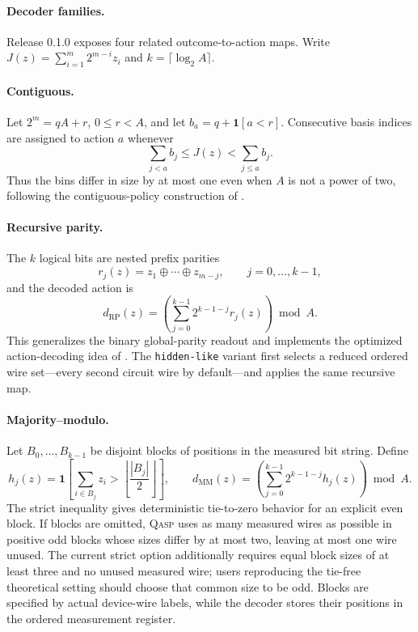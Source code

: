 \documentclass[10pt]{article}
\newcommand{\qasp}{\textsc{Qasp}}
\newcommand{\code}[1]{\texttt{#1}}
\newcommand{\version}{0.1.0}
\begin{document}
\paragraph{Decoder families.}

Release \version{} exposes four related outcome-to-action maps.  Write
$J(z)=\sum_{i=1}^{m}2^{m-i}z_i$ and
$k=\lceil\log_2A\rceil$.

\paragraph{Contiguous.}
Let $2^m=qA+r$, $0\leq r<A$, and let
$b_a=q+\mathbf 1[a<r]$.  Consecutive basis indices are assigned to action
$a$ whenever
\begin{equation}
  \sum_{j<a}b_j\leq J(z)<\sum_{j\leq a}b_j.
  \label{eq:contiguous-decoder}
\end{equation}
Thus the bins differ in size by at most one even when $A$ is not a power of
two, following the contiguous-policy construction of
\citet{jerbi2021policies}.

\paragraph{Recursive parity.}
The $k$ logical bits are nested prefix parities
\begin{equation}
  r_j(z)=z_1\oplus\cdots\oplus z_{m-j},
  \qquad j=0,\ldots,k-1,
  \label{eq:recursive-parity-bits}
\end{equation}
and the decoded action is
\begin{equation}
  d_{\mathrm{RP}}(z)
  =\left(\sum_{j=0}^{k-1}2^{k-1-j}r_j(z)\right)\bmod A.
  \label{eq:recursive-parity-decoder}
\end{equation}
This generalizes the binary global-parity readout and implements the optimized
action-decoding idea of \citet{Meyer2023ActionDecoding}.  The
\code{hidden-like} variant first selects a reduced ordered wire set---every
second circuit wire by default---and applies the same recursive map.

\paragraph{Majority--modulo.}
Let $B_0,\ldots,B_{k-1}$ be disjoint blocks of positions in the measured
bit string.  Define
\begin{equation}
  h_j(z)=\mathbf 1\!\left[
    \sum_{i\in B_j}z_i>\left\lfloor\frac{|B_j|}{2}\right\rfloor
  \right],
  \qquad
  d_{\mathrm{MM}}(z)
  =\left(\sum_{j=0}^{k-1}2^{k-1-j}h_j(z)\right)\bmod A.
  \label{eq:majority-modulo-decoder}
\end{equation}
The strict inequality gives deterministic tie-to-zero behavior for an
explicit even block.  If blocks are omitted, \qasp{} uses as many measured
wires as possible in positive odd blocks whose sizes differ by at most two,
leaving at most one wire unused.  The current strict option additionally
requires equal block sizes of at least three and no unused measured wire;
users reproducing the tie-free theoretical setting should choose that common
size to be odd.  Blocks are specified by actual device-wire labels, while the
decoder stores their positions in the ordered measurement register.
\end{document}
